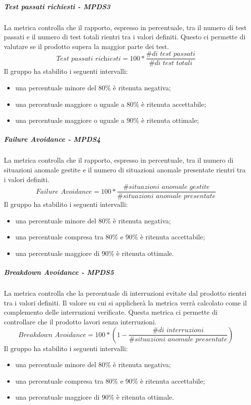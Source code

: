 \documentclass[PianoDiQualifica.tex]{subfiles}
\begin{document}
				
				\hypertarget{test_passati}{\subparagraph{Test passati richiesti - MPDS3}}
				La metrica controlla che il rapporto, espresso in percentuale, tra il numero di test passati e il numero di test totali rientri tra i valori definiti. Questo ci permette
				di valutare se il prodotto supera la maggior parte dei test. \\
				\begin{equation}\textit{Test passati richiesti} = 100 * \frac{\textit{\# di test passati}}{\textit{\# di test totali}}\end{equation}
				Il gruppo ha stabilito i seguenti intervalli:
				\begin{itemize}
					\item una percentuale minore del 80\% è ritenuta negativa;
					\item una percentuale maggiore o uguale a 80\% è ritenuta accettabile;
					\item una percentuale maggiore o uguale a 90\% è ritenuta ottimale;
				\end{itemize}
				
				\hypertarget{failure}{\subparagraph{Failure Avoidance - MPDS4}}
				La metrica controlla che il rapporto, espresso in percentuale, tra il numero di situazioni anomale gestite e il numero di situazioni anomale presentate rientri tra i valori definiti.
				\begin{equation}\textit{Failure Avoidance} = 100 * \frac{\textit{\# situazioni anomale gestite}}{\textit{\# situazioni anomale presentate}}\end{equation}
				Il gruppo ha stabilito i seguenti intervalli:
				\begin{itemize}
					\item una percentuale minore del 80\% è ritenuta negativa;
					\item una percentuale compresa tra 80\% e 90\% è ritenuta accettabile;
					\item una percentuale maggiore di 90\% è ritenuta ottimale.
				\end{itemize}
				
				\hypertarget{breakdown}{\subparagraph{Breakdown Avoidance - MPDS5}}
				La metrica controlla che la percentuale di interruzioni evitate dal prodotto rientri tra i valori definiti. Il valore su cui si applicherà la metrica verrà calcolato come il
				complemento delle interruzioni verificate. Questa metrica ci permette di controllare che il prodotto lavori senza interruzioni.
				\begin{equation}\textit{Breakdown Avoidance} = 100 * \left ( 1 - \frac{\textit{\# di interruzioni}}{\textit{\# situazioni anomale presentate}} \right ) \end{equation}
				Il gruppo ha stabilito i seguenti intervalli:
				\begin{itemize}
					\item una percentuale minore del 80\% è ritenuta negativa;
					\item una percentuale compresa tra 80\% e 90\% è ritenuta accettabile;
					\item una percentuale maggiore di 90\% è ritenuta ottimale.
				\end{itemize}
				
\end{document}
